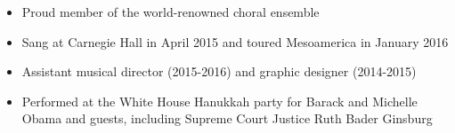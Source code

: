\documentclass{zres}
\begin{document}
\begin{resume}
\begin{itemize}[leftmargin=10pt]
  \item Proud member of the world-renowned choral ensemble
  \item Sang at Carnegie Hall in April 2015 and toured Mesoamerica in January 2016
\end{itemize}

\begin{itemize}[leftmargin=10pt]
  \item Assistant musical director (2015-2016) and graphic designer (2014-2015)
  \item Performed at the White House Hanukkah party for Barack and Michelle Obama and guests, including Supreme Court Justice Ruth Bader Ginsburg
\end{itemize}

\end{resume}
\end{document}
